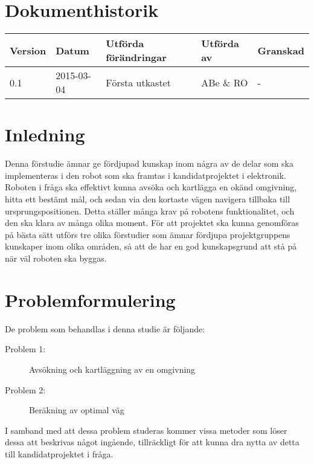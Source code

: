 \documentclass[11pt]{article}
\begin{document}
	\pagebreak
	
	\setcounter{secnumdepth}{3} %
	
	\tableofcontents	%
	
	\pagebreak
	
	\section*{Dokumenthistorik}
	\begin{table}[h]
		\begin{tabular}{|l|l|l|l|l|} \hline
			
			Version & 
			Datum & 
			Utförda förändringar & 
			Utförda av & 
			Granskad \\[0.1in] \hline
			
			0.1 &
			2015-03-04 &
			Första utkastet &
			ABe \& RO &
			- \\ \hline
			
		\end{tabular}
	\end{table}
	
	
	\pagebreak
	
	
	\section{Inledning}
	Denna förstudie ämnar ge fördjupad kunskap inom några av de delar som ska implementeras i den robot som ska framtas i kandidatprojektet i elektronik. Roboten i fråga ska effektivt kunna avsöka och kartlägga en okänd omgivning, hitta ett bestämt mål, och sedan via den kortaste vägen navigera tillbaka till ursprungspositionen. Detta ställer många krav på robotens funktionalitet, och den ska klara av många olika moment. För att projektet ska kunna genomföras på bästa sätt utförs tre olika förstudier som ämnar fördjupa projektgruppens kunskaper inom olika områden, så att de har en god kunskapsgrund att stå på när väl roboten ska byggas.\\[0.1in]
	
	\section{Problemformulering}
	\label{sec:problemform}
	De problem som behandlas i denna studie är följande:
	\begin{description}
	     \item[Problem 1:] Avsökning och kartläggning av en omgivning
	     \item[Problem 2:] Beräkning av optimal väg
	\end{description}
	I samband med att dessa problem studeras kommer vissa metoder som löser dessa att beskrivas något ingående, tillräckligt för att kunna dra nytta av detta till kandidatprojektet i fråga.\\[0.1in]
	
\end{document}
